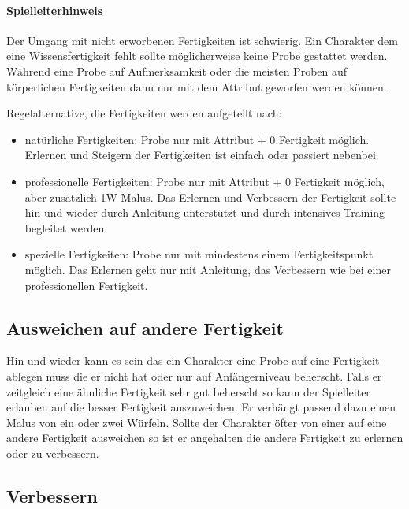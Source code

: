 \documentclass{article}
\begin{document}
\begin{mdframed}[hidealllines=true, backgroundcolor=black!10]
\paragraph{Spielleiterhinweis}

Der Umgang mit nicht erworbenen Fertigkeiten ist schwierig. Ein Charakter dem eine Wissensfertigkeit fehlt sollte
möglicherweise keine Probe gestattet werden. Während eine Probe auf Aufmerksamkeit oder die meisten Proben auf
körperlichen Fertigkeiten dann nur mit dem Attribut geworfen werden können.

Regelalternative, die Fertigkeiten werden aufgeteilt nach:
\begin{itemize}
\item natürliche Fertigkeiten: Probe nur mit Attribut + 0 Fertigkeit möglich. Erlernen und Steigern der Fertigkeiten ist einfach oder passiert nebenbei.
\item professionelle Fertigkeiten: Probe nur mit Attribut + 0 Fertigkeit möglich, aber zusätzlich 1W Malus. Das Erlernen und Verbessern der Fertigkeit sollte hin und wieder durch Anleitung unterstützt und durch intensives Training begleitet werden.
\item spezielle Fertigkeiten: Probe nur mit mindestens einem Fertigkeitspunkt möglich. Das Erlernen geht nur mit Anleitung, das Verbessern wie bei einer professionellen Fertigkeit.
\end{itemize}

\end{mdframed}
\begin{center}
\subsection{Ausweichen auf andere Fertigkeit}
\end{center}

Hin und wieder kann es sein das ein Charakter eine Probe auf eine Fertigkeit ablegen muss die er nicht hat oder nur
auf Anfängerniveau beherscht. Falls er zeitgleich eine ähnliche Fertigkeit sehr gut beherscht so kann der
Spielleiter erlauben auf die besser Fertigkeit auszuweichen. Er verhängt passend dazu einen Malus von ein oder zwei
Würfeln. Sollte der Charakter öfter von einer auf eine andere Fertigkeit ausweichen so ist er angehalten die andere
Fertigkeit zu erlernen oder zu verbessern.

\begin{center}
\subsection{Verbessern}
\end{center}
\end{document}
